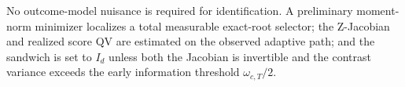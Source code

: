 No outcome-model nuisance is required for identification. A preliminary moment-norm minimizer localizes a total measurable exact-root selector; the Z-Jacobian and realized score QV are estimated on the observed adaptive path; and the sandwich is set to \(I_d\) unless both the Jacobian is invertible and the contrast variance exceeds the early information threshold \(\omega_{c,T}/2\).